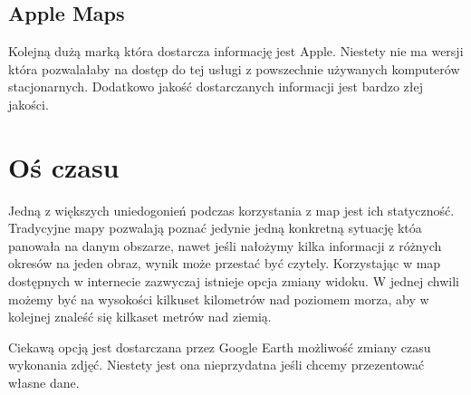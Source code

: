 \subsection{Apple Maps}
\label{subsec:Apple Maps}

Kolejną dużą marką która dostarcza informację jest Apple. Niestety nie ma wersji która pozwalałaby na dostęp do tej usługi z powszechnie używanych komputerów stacjonarnych. Dodatkowo jakość dostarczanych informacji jest bardzo złej jakości.



\section{Oś czasu}
\label{sec:osCzasu}

Jedną z większych uniedogonień podczas korzystania z map jest ich statyczność. Tradycyjne mapy pozwalają poznać jedynie jedną konkretną sytuację któa panowała na danym obszarze, nawet jeśli nałożymy kilka informacji z różnych okresów na jeden obraz, wynik może przestać być czytely. Korzystając w map dostępnych w internecie zazwyczaj istnieje opcja zmiany widoku. W jednej chwili możemy być na wysokości kilkuset kilometrów nad poziomem morza, aby w kolejnej znaleść się kilkaset metrów nad ziemią.

Ciekawą opcją jest dostarczana przez Google Earth możliwość zmiany czasu wykonania zdjęć. Niestety jest ona nieprzydatna jeśli chcemy przezentować własne dane.




